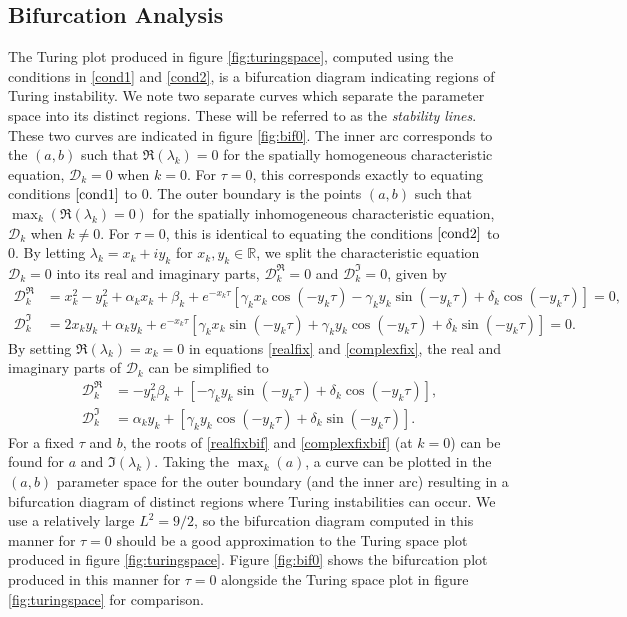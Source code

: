 \subsection{Bifurcation Analysis}\label{section:fixedbif}
The Turing plot produced in figure \ref{fig:turingspace}, computed using the conditions in \eqref{cond1} and \eqref{cond2}, is a bifurcation diagram indicating regions of Turing instability. We note two separate curves which separate the parameter space into its distinct regions. These will be referred to as the \textit{stability lines}.
These two curves are indicated in figure \ref{fig:bif0}. The inner arc corresponds to the $(a,b)$ such that $\Re(\lambda_k)=0$ for the
spatially homogeneous characteristic equation, $\mathcal{D}_k=0$ when $k=0$. For $\tau=0$, this corresponds exactly to equating conditions $\eqref{cond1}$ to 0. The outer boundary is the points $(a,b)$ such that $\max_k(\Re(\lambda_k)=0)$ for the spatially inhomogeneous characteristic equation, $\mathcal{D}_k$ when $k\neq0$. For $\tau=0$, this is identical to equating the conditions $\eqref{cond2}$ to 0. By letting $\lambda_k=x_k+iy_k$ for $x_k,y_k\in\mathbb{R}$, we split the characteristic equation $\mathcal{D}_k=0$ into its real and imaginary parts, $\mathcal{D}_k^{\Re}=0$ and $\mathcal{D}_k^{\Im}=0$, given by
\begin{align}\label{realfix}
\mathcal{D}_k^{\Re}&=x_k^2-y_k^2+\alpha_kx_k+\beta_k+e^{-x_k\tau}[\gamma_kx_k\cos(-y_k\tau)-\gamma_ky_k\sin(-y_k\tau)+\delta_k\cos(-y_k\tau)]=0,\\
\mathcal{D}_k^{\Im}&=2x_ky_k+\alpha_ky_k+e^{-x_k\tau}[\gamma_kx_k\sin(-y_k\tau)+\gamma_ky_k\cos(-y_k\tau)+\delta_k\sin(-y_k\tau)]=0.\label{complexfix}
\end{align}
By setting $\Re(\lambda_k)=x_k=0$ in equations \eqref{realfix} and \eqref{complexfix}, the real and imaginary parts of $\mathcal{D}_k$ can be simplified to
\begin{align}\label{realfixbif}
  \mathcal{D}_k^{\Re}&=-y_k^2\beta_k+[-\gamma_ky_k\sin(-y_k\tau)+\delta_k\cos(-y_k\tau)],\\
  \mathcal{D}_k^{\Im}&=\alpha_ky_k+[\gamma_ky_k\cos(-y_k\tau)+\delta_k\sin(-y_k\tau)].\label{complexfixbif}
\end{align}
For a fixed $\tau$ and $b$, the roots of \eqref{realfixbif} and \eqref{complexfixbif} (at $k=0$) can be found for $a$ and $\Im(\lambda_k)$.
Taking the $\max_k(a)$, a curve can be plotted in the $(a,b)$ parameter space for the outer boundary (and the inner arc) resulting in a bifurcation diagram of distinct regions where Turing instabilities can occur. We use a relatively large $L^2=9/2$, so the bifurcation diagram computed in this manner for $\tau=0$ should be a good approximation to the Turing space plot produced in figure \ref{fig:turingspace}. Figure \ref{fig:bif0} shows the bifurcation plot produced in this manner for $\tau=0$ alongside the Turing space plot in figure \ref{fig:turingspace} for comparison.

